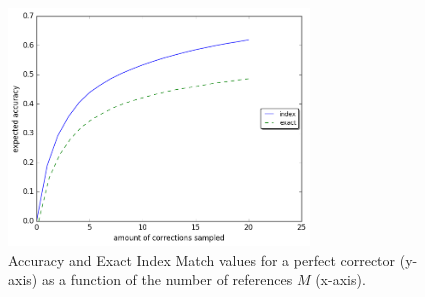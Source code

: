 \documentclass[letterpaper, 11pt]{article}
\begin{document}
%
%
%
%

\begin{figure}
	\vspace{-1em}
  \includegraphics[width=8cm]{noSig_repeat_1000_accuracy}
  \caption{Accuracy and Exact Index Match values for a perfect corrector (y-axis)
    as a function of the number of references $M$ (x-axis).
  } \label{fig:accuracy_vals}
  \vspace{-0.5cm}
\end{figure}
\end{document}
